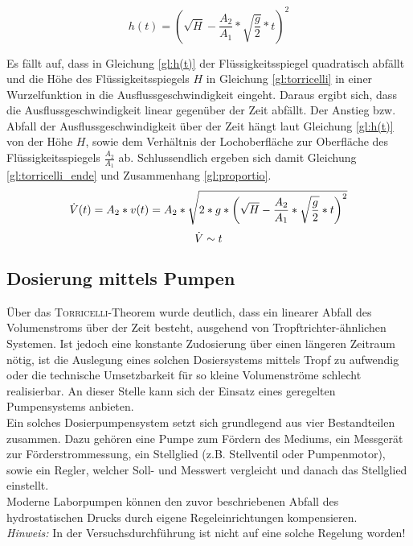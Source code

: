 \begin{equation}
	\label{gl:h(t)}
	h(t) = \left(\sqrt{H}-\frac{A_2}{A_1}*\sqrt{\frac{g}{2}}*t\right)^2
\end{equation}

Es fällt auf, dass in Gleichung \eqref{gl:h(t)} der Flüssigkeitsspiegel quadratisch abfällt und die Höhe des Flüssigkeitsspiegels $H$ in Gleichung \eqref{gl:torricelli} in einer Wurzelfunktion in die Ausflussgeschwindigkeit eingeht. Daraus ergibt sich, dass die Ausflussgeschwindigkeit linear gegenüber der Zeit abfällt. Der Anstieg bzw. Abfall der Ausflussgeschwindigkeit über der Zeit hängt laut Gleichung \eqref{gl:h(t)} von der Höhe $H$, sowie dem Verhältnis der Lochoberfläche zur Oberfläche des Flüssigkeitsspiegels $\frac{A_2}{A_1}$ ab. Schlussendlich ergeben sich damit Gleichung \eqref{gl:torricelli_ende} und Zusammenhang \eqref{gl:proportio}.
\begin{equation}
	\label{gl:torricelli_ende}
	\dot{V}(t) = A_2*v(t) =  A_2*\sqrt{2*g*\left(\sqrt{H}-\frac{A_2}{A_1}*\sqrt{\frac{g}{2}}*t\right)^2} \\
\end{equation}
\begin{equation}
	\label{gl:proportio}
	\dot{V} \sim t \\
\end{equation}

\subsection{Dosierung mittels Pumpen}
Über das \textsc{Torricelli}-Theorem wurde deutlich, dass ein linearer Abfall des Volumenstroms über der Zeit besteht, ausgehend von Tropftrichter-ähnlichen Systemen. Ist jedoch eine konstante Zudosierung über einen längeren Zeitraum nötig, ist die Auslegung eines solchen Dosiersystems mittels Tropf zu aufwendig oder die technische Umsetzbarkeit für so kleine Volumenströme schlecht realisierbar. An dieser Stelle kann sich der Einsatz eines geregelten Pumpensystems anbieten. \\
Ein solches Dosierpumpensystem setzt sich grundlegend aus vier Bestandteilen zusammen. Dazu gehören eine Pumpe zum Fördern des Mediums, ein Messgerät zur Förderstrommessung, ein Stellglied (z.B. Stellventil oder Pumpenmotor), sowie ein Regler, welcher Soll- und Messwert vergleicht und danach das Stellglied einstellt. \cite{Ignatowitz.2013}\\
Moderne Laborpumpen können den zuvor beschriebenen Abfall des hydrostatischen Drucks durch eigene Regeleinrichtungen kompensieren. \cite{https:www.industr.com.16.06.2021}\\
\textit{Hinweis:} In der Versuchsdurchführung ist nicht auf eine solche Regelung worden!

